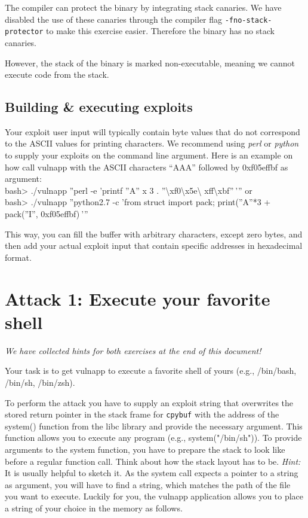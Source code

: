 \documentclass[a4paper,11pt]{article}
\begin{document}
The compiler can protect the binary by integrating stack canaries. We have
disabled the use of these canaries through the compiler flag
\texttt{-fno-stack-protector} to make this exercise easier. Therefore the binary
has no stack canaries.

However, the stack of the binary is marked non-executable, meaning we cannot
execute code from the stack.

\subsection*{Building \& executing exploits}

Your exploit user input will typically contain byte values that do not
correspond to the ASCII values for printing characters. We recommend using {\it
perl} or {\it python} to supply your exploits on the command line argument. Here
is an example on how call vulnapp with the ASCII characters ``AAA'' followed by
0xf05effbf as argument:\\ \textsf{ bash> ./vulnapp ''\textasciigrave perl -e
'printf ''A'' x 3 . ''\textbackslash xf0\textbackslash x5e\textbackslash
xff\textbackslash xbf''$\:$'\textasciigrave''} or \\ \textsf{ bash> ./vulnapp
''\textasciigrave python2.7 -c 'from struct import pack; print(''A''*3 +
pack(''I'', 0xf05effbf)$\:$'\textasciigrave ''}

This way, you can fill the buffer with arbitrary characters, except zero bytes,
and then add your actual exploit input that contain specific addresses in
hexadecimal format.

\section*{Attack 1: Execute your favorite shell}
\emph{We have collected hints for both exercises at the end of this
  document!}

Your task is to get {\sc vulnapp} to execute a favorite shell of yours (e.g.,
/bin/bash, /bin/sh, /bin/zsh).

To perform the attack you have to supply an exploit string that overwrites the
stored return pointer in the stack frame for {\tt cpybuf} with the address of
the system() function from the libc library and provide the necessary argument.
This function allows you to execute any program (e.g., system("/bin/sh")). To
provide arguments to the system function, you have to prepare the stack to look
like before a regular function call. Think about how the stack layout has to be.
\textit{Hint:} It is usually helpful to sketch it. As the system call expects a
pointer to a string as argument, you will have to find a string, which matches
the path of the file you want to execute. Luckily for you, the vulnapp
application allows you to place a string of your choice in the memory as
follows.
\end{document}
